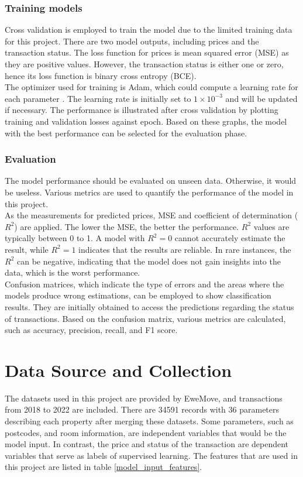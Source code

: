 \documentclass[12pt,twoside]{report}
\begin{document}
\subsubsection{Training models}
Cross validation is employed to train the model due to the limited training data for this project. There are two model outputs, including prices and the transaction status. The loss function for prices is mean squared error (MSE) as they are positive values. However, the transaction status is either one or zero, hence its loss function is binary cross entropy (BCE). 
\\

The optimizer used for training is Adam, which could compute a learning rate for each parameter \citep{RN5}. The learning rate is initially set to $1 \times 10^{-3}$ and will be updated if necessary. The performance is illustrated after cross validation by plotting training and validation losses against epoch. Based on these graphs, the model with the best performance can be selected for the evaluation phase. 

\subsubsection{Evaluation}
The model performance should be evaluated on unseen data. Otherwise, it would be useless. Various metrics are used to quantify the performance of the model in this project. 
\\

As the measurements for predicted prices, MSE and coefficient of determination ($R^2$) are applied.  The lower the MSE, the better the performance. $R^2$ values are typically between 0 to 1. A model with $R^2 = 0$ cannot accurately estimate the result, while $R^2 = 1$ indicates that the results are reliable. In rare instances, the $R^2$ can be negative, indicating that the model does not gain insights into the data, which is the worst performance. 
\\

Confusion matrices, which indicate the type of errors and the areas where the models produce wrong estimations, can be employed to show classification results. They are initially obtained to access the predictions regarding the status of transactions. Based on the confusion matrix, various metrics are calculated, such as accuracy, precision, recall, and F1 score. 

\section{Data Source and Collection}
The datasets used in this project are provided by EweMove, and transactions from 2018 to 2022 are included. There are 34591 records with 36 parameters describing each property after merging these datasets. Some parameters, such as postcodes, and room information, are independent variables that would be the model input. In contrast, the price and status of the transaction are dependent variables that serve as labels of supervised learning. The features that are used in this project are listed in table \ref{model_input_features}. 
\end{document}
